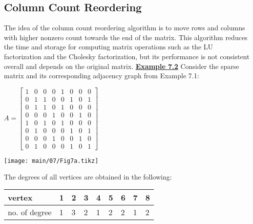   \subsection{Column Count Reordering}
  \vskip 10pt
  \noindent
  The idea of the column count reordering algorithm is to move rows and columns
  with higher nonzero count towards the end of the matrix. This algorithm reduces
  the time and storage for computing matrix operations such as the LU
  factorization and the Cholesky factorization, but its performance is not
  consistent overall and depends on the original matrix.
  \vskip 10pt
  \noindent
  {\bf\underline {Example 7.2}}
  \vskip 2pt
  \noindent
  Consider the sparse matrix and its corresponding adjacency graph from Example
  7.1:
  \vskip 4pt
  \noindent
  \begin{table}[H]
    \begin{minipage}[b]{0.50\linewidth}
      \vskip 2pt
      \begin{center}
        $A=
        \begin{bmatrix}
          1 & 0 & 0 & 0 & 1 & 0 & 0 & 0 \\
          0 & 1 & 1 & 0 & 0 & 1 & 0 & 1 \\
          0 & 1 & 1 & 0 & 1 & 0 & 0 & 0 \\
          0 & 0 & 0 & 1 & 0 & 0 & 1 & 0 \\
          1 & 0 & 1 & 0 & 1 & 0 & 0 & 0 \\
          0 & 1 & 0 & 0 & 0 & 1 & 0 & 1 \\
          0 & 0 & 0 & 1 & 0 & 0 & 1 & 0 \\
          0 & 1 & 0 & 0 & 0 & 1 & 0 & 1
        \end{bmatrix}$
      \end{center}
      \vspace{5mm}
    \end{minipage}
    \begin{minipage}[b]{0.49\linewidth}
      \begin{center}
        \texttt{[image: main/07/Fig7a.tikz]}
      \end{center}
    \end{minipage}
  \end{table}
  \vskip -10pt
  The degrees of all vertices are obtained in the following:
  \vskip 10pt
  \noindent
  \begin{center}
    \begin{tabular}{ l | l l l l l l l l }
      vertex          & 1 & 2 & 3 & 4 & 5 & 6 & 7 & 8 \\
      \hline
      no. of degree   & 1 & 3 & 2 & 1 & 2 & 2 & 1 & 2 \\
    \end{tabular}
  \end{center}
